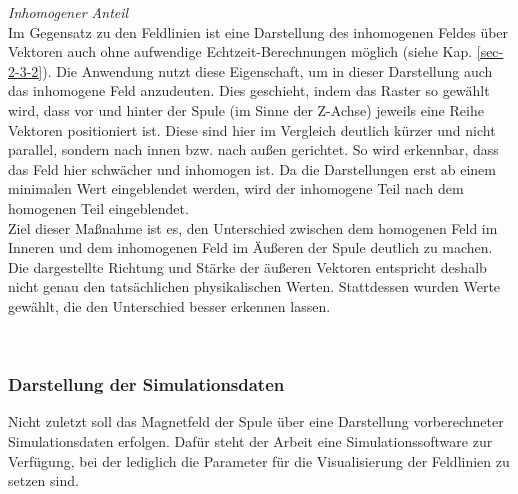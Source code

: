 \textit{Inhomogener Anteil}\\
Im Gegensatz zu den Feldlinien ist eine Darstellung des inhomogenen Feldes über Vektoren auch ohne aufwendige Echtzeit-Berechnungen möglich (siehe Kap. \ref{sec-2-3-2}). Die Anwendung nutzt diese Eigenschaft, um in dieser Darstellung auch das inhomogene Feld anzudeuten. Dies geschieht, indem das Raster so gewählt wird, dass vor und hinter der Spule (im Sinne der Z-Achse) jeweils eine Reihe Vektoren positioniert ist. Diese sind hier im Vergleich deutlich kürzer und nicht parallel, sondern nach innen bzw. nach außen gerichtet. So wird erkennbar, dass das Feld hier schwächer und inhomogen ist. Da die Darstellungen erst ab einem minimalen Wert eingeblendet werden, wird der inhomogene Teil nach dem homogenen Teil eingeblendet.\\
\noindent\hspace*{5mm}
Ziel dieser Maßnahme ist es, den Unterschied zwischen dem homogenen Feld im Inneren und dem inhomogenen Feld im Äußeren der Spule deutlich zu machen. Die dargestellte Richtung und Stärke der äußeren Vektoren entspricht deshalb nicht genau den tatsächlichen physikalischen Werten. Stattdessen wurden Werte gewählt, die den Unterschied besser erkennen lassen.

\vspace{4px}
\begin{center}
	\\
\end{center}
\vspace{6px}

\subsubsection{Darstellung der Simulationsdaten}
\label{sec-4-4-3}
Nicht zuletzt soll das Magnetfeld der Spule über eine Darstellung vorberechneter Simulationsdaten erfolgen. Dafür steht der Arbeit eine Simulationssoftware zur Verfügung, bei der lediglich die Parameter für die Visualisierung der Feldlinien zu setzen sind.\\


